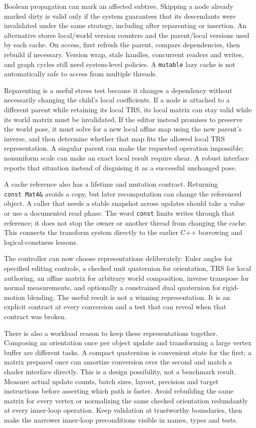 Boolean propagation can mark an affected subtree. Skipping a node already marked dirty is valid only if the system guarantees that its descendants were invalidated under the same strategy, including after reparenting or insertion. An alternative stores local/world version counters and the parent/local versions used by each cache. On access, first refresh the parent, compare dependencies, then rebuild if necessary. Version wrap, stale handles, concurrent readers and writes, and graph cycles still need system-level policies. A \texttt{mutable} lazy cache is not automatically safe to access from multiple threads.

Reparenting is a useful stress test because it changes a dependency without necessarily changing the child's local coefficients. If a node is attached to a different parent while retaining its local TRS, its local matrix can stay valid while its world matrix must be invalidated. If the editor instead promises to preserve the world pose, it must solve for a new local affine map using the new parent's inverse, and then determine whether that map fits the allowed local TRS representation. A singular parent can make the requested operation impossible; nonuniform scale can make an exact local result require shear. A robust interface reports that situation instead of disguising it as a successful unchanged pose.

A cache reference also has a lifetime and mutation contract. Returning \texttt{const\ Mat4\&} avoids a copy, but later recomputation can change the referenced object. A caller that needs a stable snapshot across updates should take a value or use a documented read phase. The word \texttt{const} limits writes through that reference; it does not stop the owner or another thread from changing the cache. This connects the transform system directly to the earlier C++ borrowing and logical-constness lessons.

The controller can now choose representations deliberately: Euler angles for specified editing controls, a checked unit quaternion for orientation, TRS for local authoring, an affine matrix for arbitrary world composition, inverse transpose for normal measurements, and optionally a constrained dual quaternion for rigid-motion blending. The useful result is not a winning representation. It is an explicit contract at every conversion and a test that can reveal when that contract was broken.

There is also a workload reason to keep these representations together. Composing an orientation once per object update and transforming a large vertex buffer are different tasks. A compact quaternion is convenient state for the first; a matrix prepared once can amortize conversion over the second and match a shader interface directly. This is a design possibility, not a benchmark result. Measure actual update counts, batch sizes, layout, precision and target instructions before asserting which path is faster. Avoid rebuilding the same matrix for every vertex or normalizing the same checked orientation redundantly at every inner-loop operation. Keep validation at trustworthy boundaries, then make the narrower inner-loop preconditions visible in names, types and tests.

